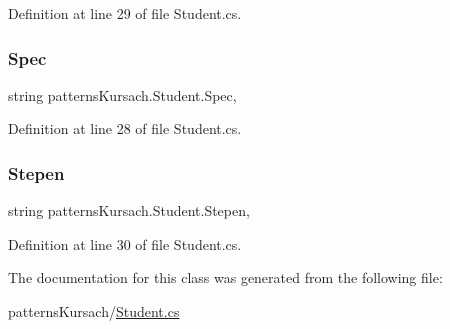 Definition at line 29 of file Student.\+cs.

\mbox{\label{classpatterns_kursach_1_1_student_aaf96519bff25150a3ea2304c22f1cd40}} 
\subsubsection{\texorpdfstring{Spec}{Spec}}
{\footnotesize\ttfamily string patterns\+Kursach.\+Student.\+Spec\hspace{0.3cm}{\ttfamily [get]}, {\ttfamily [set]}}



Definition at line 28 of file Student.\+cs.

\mbox{\label{classpatterns_kursach_1_1_student_ac1d80f7fe47b9814382d25f416f68192}} 
\subsubsection{\texorpdfstring{Stepen}{Stepen}}
{\footnotesize\ttfamily string patterns\+Kursach.\+Student.\+Stepen\hspace{0.3cm}{\ttfamily [get]}, {\ttfamily [set]}}



Definition at line 30 of file Student.\+cs.



The documentation for this class was generated from the following file\+:\begin{DoxyCompactItemize}
\item 
patterns\+Kursach/\mbox{\hyperlink{_student_8cs}{Student.\+cs}}\end{DoxyCompactItemize}

